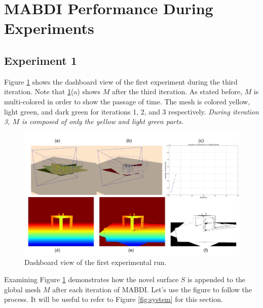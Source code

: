 \section{MABDI Performance During Experiments}
\label{section:results1}

\subsection{Experiment 1}

Figure \ref{fig:run1} shows the dashboard view of the first experiment during
the third iteration. Note that \ref{fig:run1}(a) shows $M$ after the third
iteration. As stated before, $M$ is multi-colored in order to show the passage
of time. The mesh is colored yellow, light green, and dark green for iterations
1, 2, and 3 respectively. \emph{During iteration 3, $M$ is composed of only the
yellow and light green parts.}

\begin{figure}[h]%
\centering
  \includegraphics[width=\textwidth]{figures/results_run1.pdf}
  \caption{Dashboard view of the first experimental run.}
  \label{fig:run1}
\end{figure}

Examining Figure \ref{fig:run1} demonstrates how the novel surface
$S$ is appended to the global mesh $M$ after each iteration of MABDI. Let's use
the figure to follow the process. It will be useful to refer to Figure
\ref{fig:system} for this section.

